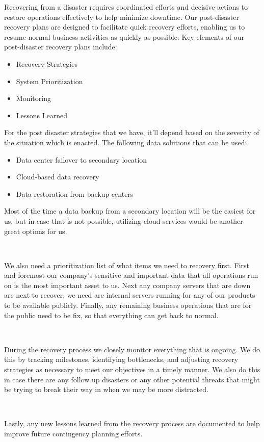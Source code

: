 \documentclass[12pt,a4paper]{report}
\begin{document}
Recovering from a disaster requires coordinated efforts and decisive actions to restore operations effectively to help minimize downtime.
Our post-disaster recovery plans are designed to facilitate quick recovery efforts, enabling us to resume normal business activities as quickly as possible. 
Key elements of our post-disaster recovery plans include:
\begin{itemize}
 \item Recovery Strategies
 \item System Prioritization
 \item Monitoring
 \item Lessons Learned
\end{itemize}

For the post disaster strategies that we have, it'll depend based on the severity of the situation which is enacted.
The following data solutions that can be used:
\begin{itemize}
 \item Data center failover to secondary location
 \item Cloud-based data recovery
 \item Data restoration from backup centers
\end{itemize}
Most of the time a data backup from a secondary location will be the easiest for us, but in case that is not possible, utilizing cloud services would be another great options for us.

\

We also need a prioritization list of what items we need to recovery first.
First and foremost our company's sensitive and important data that all operations run on is the most important asset to us.
Next any company servers that are down are next to recover, we need are internal servers running for any of our products to be available publicly.
Finally, any remaining business operations that are for the public need to be fix, so that everything can get back to normal.

\

During the recovery process we closely monitor everything that is ongoing.
We do this by tracking milestones, identifying bottlenecks, and adjusting recovery strategies as necessary to meet our objectives in a timely manner.
We also do this in case there are any follow up disasters or any other potential threats that might be trying to break their way in when we may be more distracted. 

\

Lastly, any new lessons learned from the recovery process are documented to help improve future contingency planning efforts.
 
\end{document}
